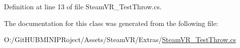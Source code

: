 Definition at line 13 of file Steam\+V\+R\+\_\+\+Test\+Throw.\+cs.



The documentation for this class was generated from the following file\+:\begin{DoxyCompactItemize}
\item 
O\+:/\+Git\+H\+U\+B\+M\+I\+N\+I\+P\+Roject/\+Assets/\+Steam\+V\+R/\+Extras/\mbox{\hyperlink{_steam_v_r___test_throw_8cs}{Steam\+V\+R\+\_\+\+Test\+Throw.\+cs}}\end{DoxyCompactItemize}
